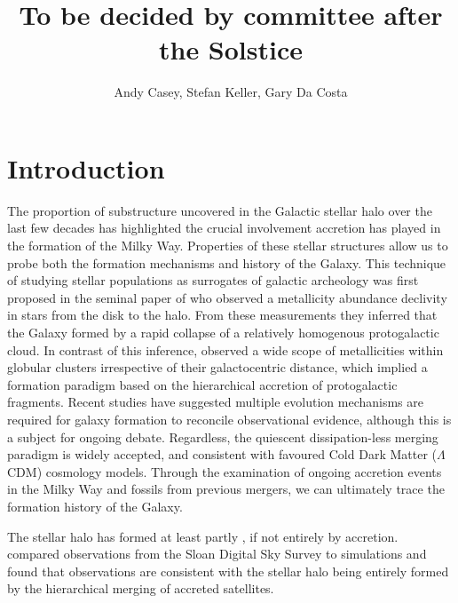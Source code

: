 \documentclass{emulateapj}
\begin{document}
	\title{To be decided by committee after the Solstice}
	\author{Andy Casey, Stefan Keller, Gary Da Costa}
		
	
	\begin{abstract}

	\end{abstract}
	
	
	
	
	
	\section{Introduction}
	
	The proportion of substructure uncovered in the Galactic stellar halo over the last few decades has highlighted the crucial involvement accretion has played in the formation of the Milky Way. Properties of these stellar structures allow us to probe both the formation mechanisms and history of the Galaxy. This technique of studying stellar populations as surrogates of galactic archeology was first proposed in the seminal paper of \citet{Eggen;Lynden-Bell;Sandage_1962} who observed a metallicity abundance declivity in stars from the disk to the halo. From these measurements they inferred that  the Galaxy formed by a rapid collapse of a relatively homogenous protogalactic cloud. In contrast of this inference, \citet{Searle;Zinn_1978} observed a wide scope of metallicities within globular clusters irrespective of their galactocentric distance, which implied a formation paradigm based on the hierarchical accretion of protogalactic fragments. Recent studies \citep{Carollo;et-al_2007, Carollo;et-al_2010} have suggested multiple evolution mechanisms are required for galaxy formation to reconcile observational evidence, although this is a subject for ongoing debate. Regardless, the quiescent dissipation-less merging paradigm is widely accepted, and consistent with favoured Cold Dark Matter ($\Lambda$CDM) cosmology models. Through the examination of ongoing accretion events in the Milky Way and fossils from previous mergers, we can ultimately trace the formation history of the Galaxy. 
	
		
	The stellar halo has formed at least partly \citep{Starkenburg;et-al_2009}, if not entirely by accretion. \citet{Bell;et-al_2008} compared observations from the Sloan Digital Sky Survey \citep[hereafter SDSS]{York;et-al_2000} to simulations and found that observations are consistent with the stellar halo being entirely formed by the hierarchical merging of accreted satellites.
	
\end{document}
